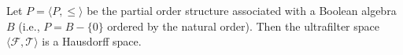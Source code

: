 Let $P = \langle P, \leq \rangle$ be the partial order structure associated with a Boolean algebra $B$ (i.e., $P = B - \{0\}$ ordered by the natural order). Then the ultrafilter space $\langle \mathcal{F}, \mathcal{T} \rangle$ is a Hausdorff space.
